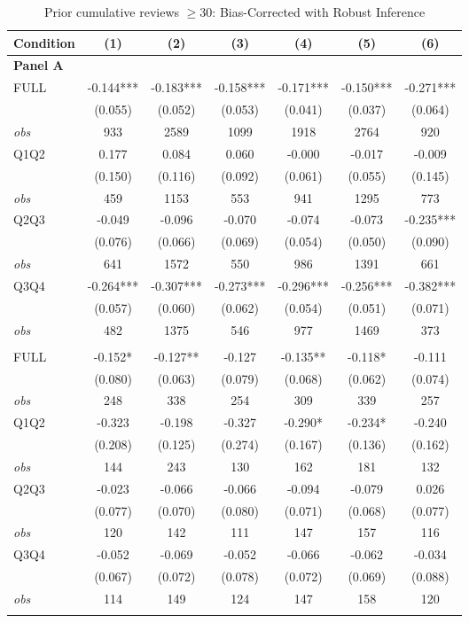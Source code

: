 \begin{table}[!htbp]
\centering
\caption{Prior cumulative reviews $\geq30$: Bias-Corrected with Robust Inference}
\begin{tabular}{lcccccc}
\toprule
Condition & (1) & (2) & (3) & (4) & (5) & (6) \\
\midrule
\multicolumn{7}{l}{\textbf{Panel A}} \\

FULL & -0.144*** & -0.183*** & -0.158*** & -0.171*** & -0.150*** & -0.271*** \\
 & (0.055) & (0.052) & (0.053) & (0.041) & (0.037) & (0.064) \\
\textit{obs} & 933 & 2589 & 1099 & 1918 & 2764 & 920 \\
Q1Q2 & 0.177 & 0.084 & 0.060 & -0.000 & -0.017 & -0.009 \\
 & (0.150) & (0.116) & (0.092) & (0.061) & (0.055) & (0.145) \\
\textit{obs} & 459 & 1153 & 553 & 941 & 1295 & 773 \\
Q2Q3 & -0.049 & -0.096 & -0.070 & -0.074 & -0.073 & -0.235*** \\
 & (0.076) & (0.066) & (0.069) & (0.054) & (0.050) & (0.090) \\
\textit{obs} & 641 & 1572 & 550 & 986 & 1391 & 661 \\
Q3Q4 & -0.264*** & -0.307*** & -0.273*** & -0.296*** & -0.256*** & -0.382*** \\
 & (0.057) & (0.060) & (0.062) & (0.054) & (0.051) & (0.071) \\
\textit{obs} & 482 & 1375 & 546 & 977 & 1469 & 373 \\
\addlinespace
\multicolumn{7}{l}{\textbf{Panel B}} \\

FULL & -0.152* & -0.127** & -0.127 & -0.135** & -0.118* & -0.111 \\
 & (0.080) & (0.063) & (0.079) & (0.068) & (0.062) & (0.074) \\
\textit{obs} & 248 & 338 & 254 & 309 & 339 & 257 \\
Q1Q2 & -0.323 & -0.198 & -0.327 & -0.290* & -0.234* & -0.240 \\
 & (0.208) & (0.125) & (0.274) & (0.167) & (0.136) & (0.162) \\
\textit{obs} & 144 & 243 & 130 & 162 & 181 & 132 \\
Q2Q3 & -0.023 & -0.066 & -0.066 & -0.094 & -0.079 & 0.026 \\
 & (0.077) & (0.070) & (0.080) & (0.071) & (0.068) & (0.077) \\
\textit{obs} & 120 & 142 & 111 & 147 & 157 & 116 \\
Q3Q4 & -0.052 & -0.069 & -0.052 & -0.066 & -0.062 & -0.034 \\
 & (0.067) & (0.072) & (0.078) & (0.072) & (0.069) & (0.088) \\
\textit{obs} & 114 & 149 & 124 & 147 & 158 & 120 \\
\addlinespace
\multicolumn{7}{l}{\textbf{Panel C}} \\


\end{tabular}
\end{table}
